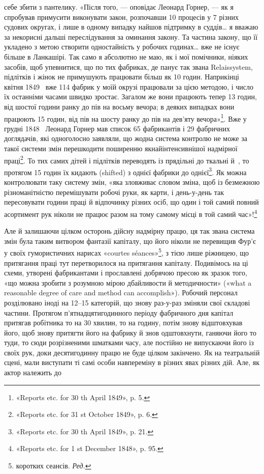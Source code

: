 \parcont{}  %
себе збити з пантелику. «Після того, — оповідає Леонард Горнер, —
як я спробував примусити виконувати закон, розпочавши 10 процесів
у 7 різних судових округах, і лише в одному випадку найшов
підтримку в суддів\dots{} я вважаю за некорисні дальші переслідування
за оминання закону. Та частина закону, що її укладено
з метою створити одностайність у робочих годинах\dots{} вже не існує
більше в Ланкашірі. Так само я абсолютно не маю, як і мої помічники,
ніяких засобів, щоб упевнитися, що по тих фабриках, де
панує так звана Relaissystem, підлітків і жінок не примушують
працювати більш як 10 годин. Наприкінці квітня 1849~ вже
114 фабрик у моїй окрузі працювали за цією методою, і число
їх останніми часами швидко зростає. Загалом же вони працюють
тепер 13 годин, від шостої години ранку до пів на восьму вечора;
в деяких випадках вони працюють 15 годин, від пів на шосту
ранку до пів на дев’яту вечора»\footnote{
«Reports etc. for 30 th April 1849», p. 5.
}. Вже у грудні 1848~ Леонард
Горнер мав список 65 фабрикантів і 29 фабричних доглядачів,
які одноголосно заявляли, що жодна система контролю не може
за такої системи змін перешкодити поширенню якнайінтенсивнішої
надмірної праці\footnote{
«Reports etc. for 31 st October 1849», p. 6.
}. То тих самих дітей і підлітків переводять
із прядільні до ткальні й~, то протягом 15 годин їх
кидають (shifted) з однієї фабрики до однієї\footnote{
«Reports etc. for 30 th April 1849», p. 21.
}. Як можна контролювати
таку систему змін, «яка зловживає словом зміна, щоб із
безмежною різноманітністю перемішувати робочі руки, як карти,
і день-у-день так пересовувати години праці й відпочинку
різних осіб, що один і той самий повний асортимент рук ніколи
не працює разом на тому самому місці в той самий час»!\footnote{
«Reports etc. for 1 st December 1848», p. 95.
}

Але й залишаючи цілком осторонь дійсну надмірну працю,
ця так звана система змін була таким витвором фантазії капіталу,
що його ніколи не перевищив Фур’є у своїх гумористичних
нарисах «courtes séances»\footnote*{
коротких сеансів. \emph{Ред.}
}, з тією лише ріжницею, що притягання
праці тут перетворилося на притягання капіталу. Подивімось
на ці схеми, утворені фабрикантами і прославлені добрячою
пресою як зразок того, «що можна зробити з розумною мірою
дбайливости й методичности» («what a reasonable degree of care
and method can accomplish»). Робочий персонал розділювано
іноді на 12--15 категорій, що знову раз-у-раз зміняли свої
складові частини. Протягом п’ятнадцятигодинного періоду фабричного
дня капітал притягав робітника то на 30 хвилин, то на
годину, потім знову відштовхував його, щоб знову притягти
його на фабрику й знов одштовхнути, ганяючи його то туди, то сюди
розрізненими шматками часу, але постійно не випускаючи його
із своїх рук, доки десятигодинну працю не буде цілком закінчено.
Як на театральній сцені, мали виступати ті самі особи навпереміну
в різних явах різних дій. Але, як актор належить до
\parbreak{}  %
